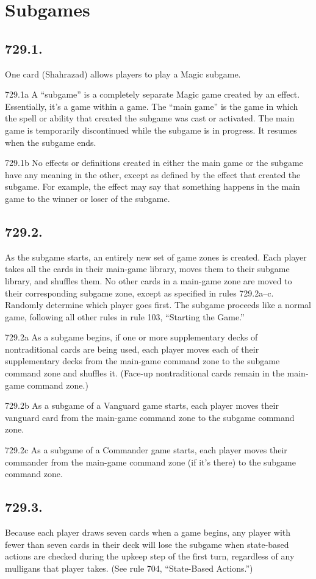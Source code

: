 \section{Subgames}
\subsection*{729.1.}
One card (Shahrazad) allows players to play a Magic subgame.

729.1a A “subgame” is a completely separate Magic game created by an effect. Essentially, it’s a game within a game. The “main game” is the game in which the spell or ability that created the subgame was cast or activated. The main game is temporarily discontinued while the subgame is in progress. It resumes when the subgame ends.

729.1b No effects or definitions created in either the main game or the subgame have any meaning in the other, except as defined by the effect that created the subgame. For example, the effect may say that something happens in the main game to the winner or loser of the subgame.

\subsection*{729.2.}
As the subgame starts, an entirely new set of game zones is created. Each player takes all the cards in their main-game library, moves them to their subgame library, and shuffles them. No other cards in a main-game zone are moved to their corresponding subgame zone, except as specified in rules 729.2a–c. Randomly determine which player goes first. The subgame proceeds like a normal game, following all other rules in rule 103, “Starting the Game.”

729.2a As a subgame begins, if one or more supplementary decks of nontraditional cards are being used, each player moves each of their supplementary decks from the main-game command zone to the subgame command zone and shuffles it. (Face-up nontraditional cards remain in the main-game command zone.)

729.2b As a subgame of a Vanguard game starts, each player moves their vanguard card from the main-game command zone to the subgame command zone.

729.2c As a subgame of a Commander game starts, each player moves their commander from the main-game command zone (if it’s there) to the subgame command zone.

\subsection*{729.3.}
Because each player draws seven cards when a game begins, any player with fewer than seven cards in their deck will lose the subgame when state-based actions are checked during the upkeep step of the first turn, regardless of any mulligans that player takes. (See rule 704, “State-Based Actions.”)

